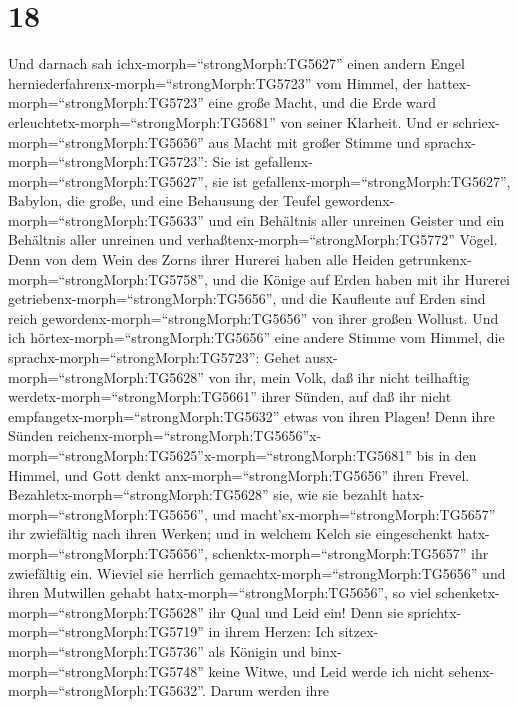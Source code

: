 \hypertarget{section-17}{%
\section{18}\label{section-17}}

 Und darnach sah ichx-morph=``strongMorph:TG5627'' einen
andern Engel herniederfahrenx-morph=``strongMorph:TG5723'' vom Himmel,
der hattex-morph=``strongMorph:TG5723'' eine große Macht, und die Erde
ward erleuchtetx-morph=``strongMorph:TG5681'' von seiner Klarheit.
 Und er schriex-morph=``strongMorph:TG5656'' aus Macht mit
großer Stimme und sprachx-morph=``strongMorph:TG5723'': Sie ist
gefallenx-morph=``strongMorph:TG5627'', sie ist
gefallenx-morph=``strongMorph:TG5627'', Babylon, die große, und eine
Behausung der Teufel gewordenx-morph=``strongMorph:TG5633'' und ein
Behältnis aller unreinen Geister und ein Behältnis aller unreinen und
verhaßtenx-morph=``strongMorph:TG5772'' Vögel.  Denn von dem
Wein des Zorns ihrer Hurerei haben alle Heiden
getrunkenx-morph=``strongMorph:TG5758'', und die Könige auf Erden haben
mit ihr Hurerei getriebenx-morph=``strongMorph:TG5656'', und die
Kaufleute auf Erden sind reich gewordenx-morph=``strongMorph:TG5656''
von ihrer großen Wollust.  Und ich
hörtex-morph=``strongMorph:TG5656'' eine andere Stimme vom Himmel, die
sprachx-morph=``strongMorph:TG5723'': Gehet
ausx-morph=``strongMorph:TG5628'' von ihr, mein Volk, daß ihr nicht
teilhaftig werdetx-morph=``strongMorph:TG5661'' ihrer Sünden, auf daß
ihr nicht empfangetx-morph=``strongMorph:TG5632'' etwas von ihren
Plagen!  Denn ihre Sünden
reichenx-morph=``strongMorph:TG5656''\textbar x-morph=``strongMorph:TG5625''x-morph=``strongMorph:TG5681''
bis in den Himmel, und Gott denkt anx-morph=``strongMorph:TG5656'' ihren
Frevel.  Bezahletx-morph=``strongMorph:TG5628'' sie, wie sie
bezahlt hatx-morph=``strongMorph:TG5656'', und
macht'sx-morph=``strongMorph:TG5657'' ihr zwiefältig nach ihren Werken;
und in welchem Kelch sie eingeschenkt hatx-morph=``strongMorph:TG5656'',
schenktx-morph=``strongMorph:TG5657'' ihr zwiefältig ein. 
Wieviel sie herrlich gemachtx-morph=``strongMorph:TG5656'' und ihren
Mutwillen gehabt hatx-morph=``strongMorph:TG5656'', so viel
schenketx-morph=``strongMorph:TG5628'' ihr Qual und Leid ein! Denn sie
sprichtx-morph=``strongMorph:TG5719'' in ihrem Herzen: Ich
sitzex-morph=``strongMorph:TG5736'' als Königin und
binx-morph=``strongMorph:TG5748'' keine Witwe, und Leid werde ich nicht
sehenx-morph=``strongMorph:TG5632''.  Darum werden ihre
